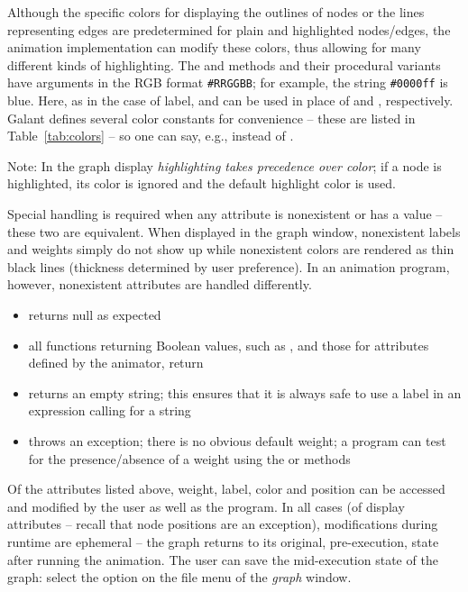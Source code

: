 Although the specific colors for displaying the outlines of nodes
or the lines representing edges are
predetermined for plain
and highlighted nodes/edges,
the animation implementation can modify these colors,
thus allowing for many different kinds of highlighting.
The  and  methods
and their procedural variants have  arguments
in the RGB format \texttt{\#RRGGBB}; for example,
the string \texttt{\#0000ff} is blue.
Here, as in the case of label,  and 
can be used in place of  and ,
respectively.
Galant defines several color constants for convenience -- 
these are listed in Table~\ref{tab:colors} -- so one can say, e.g.,
 instead of .

Note: In the graph display \emph{highlighting takes precedence over color};
if a node is highlighted, its color is ignored and the default highlight
color is used.

Special handling is required when any attribute is nonexistent or has a
 value -- these two are equivalent.
When displayed in the graph window, nonexistent labels and weights simply do
not show up while nonexistent colors are rendered as thin black lines
(thickness determined by user preference).
In an animation program, however, nonexistent attributes are handled
differently.
\begin{itemize}
\item {} returns null as expected
\item all functions returning Boolean values, such as ,
   and those for attributes defined by the animator, return
\item {} returns an empty string; this ensures that it is always
  safe to use a label in an expression calling for a string
\item {} throws an exception; there is no obvious default
  weight; a program can test for the presence/absence of a weight using the
   or  methods
\end{itemize}

Of the attributes listed above, weight, label, color and position can be
accessed and modified by the user as well as the program.
In all cases (of display attributes -- recall that node positions are an
exception), modifications during runtime are ephemeral
-- the graph returns to its original, pre-execution, state after running the
animation.
The user can save the mid-execution state of the graph:
select the  option on the file menu of the
\emph{graph} window.

